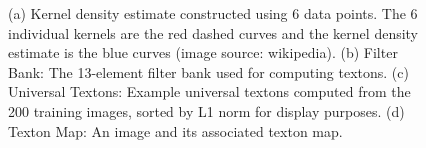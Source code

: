 \documentclass{SMBV12}
\begin{document}
\begin{figure}[htbp]
    \centering
    \caption{ (a) Kernel density estimate constructed using 6 data points. The 6 individual kernels are the red dashed curves and the kernel density estimate is the blue curves (image source: wikipedia). (b) Filter Bank: The 13-element filter bank used for computing textons. (c) Universal Textons: Example universal textons computed from the 200 training images, sorted by L1 norm for display purposes. (d) Texton Map: An image and its associated texton map.} 
\end{figure}
\end{document}
